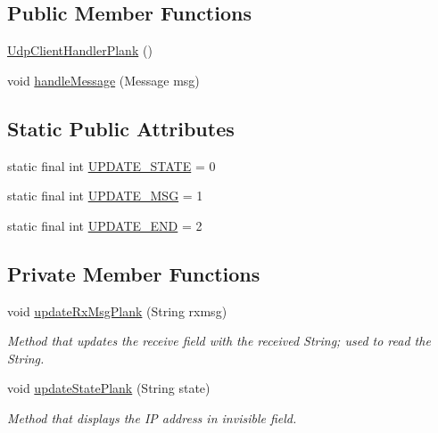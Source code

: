 \subsection*{Public Member Functions}
\begin{DoxyCompactItemize}
\item 
\mbox{\hyperlink{classcom_1_1example_1_1trainawearapplication_1_1_udp_client_handler_plank_a648a0fa42206709b739c8b754aa178dd}{Udp\+Client\+Handler\+Plank}} ()
\item 
void \mbox{\hyperlink{classcom_1_1example_1_1trainawearapplication_1_1_udp_client_handler_plank_a2182425709c67eae734dd1f8dc2e228c}{handle\+Message}} (Message msg)
\end{DoxyCompactItemize}
\subsection*{Static Public Attributes}
\begin{DoxyCompactItemize}
\item 
static final int \mbox{\hyperlink{classcom_1_1example_1_1trainawearapplication_1_1_udp_client_handler_plank_af27cd7ec8aca34d7c434ddaeb312f907}{U\+P\+D\+A\+T\+E\+\_\+\+S\+T\+A\+TE}} = 0
\item 
static final int \mbox{\hyperlink{classcom_1_1example_1_1trainawearapplication_1_1_udp_client_handler_plank_a74216073d90f6a9a7ab3731239f93eb3}{U\+P\+D\+A\+T\+E\+\_\+\+M\+SG}} = 1
\item 
static final int \mbox{\hyperlink{classcom_1_1example_1_1trainawearapplication_1_1_udp_client_handler_plank_a75f364bd8c7c31476d6f9d2b621765c8}{U\+P\+D\+A\+T\+E\+\_\+\+E\+ND}} = 2
\end{DoxyCompactItemize}
\subsection*{Private Member Functions}
\begin{DoxyCompactItemize}
\item 
void \mbox{\hyperlink{classcom_1_1example_1_1trainawearapplication_1_1_udp_client_handler_plank_a83b0d0b19d7c9be902069368bd7fa84f}{update\+Rx\+Msg\+Plank}} (String rxmsg)
\begin{DoxyCompactList}\small\item\em Method that updates the receive field with the received String; used to read the String. \end{DoxyCompactList}\item 
void \mbox{\hyperlink{classcom_1_1example_1_1trainawearapplication_1_1_udp_client_handler_plank_a68ceca8349b52704db25834ca5eb5b38}{update\+State\+Plank}} (String state)
\begin{DoxyCompactList}\small\item\em Method that displays the IP address in invisible field. \end{DoxyCompactList}\end{DoxyCompactItemize}
